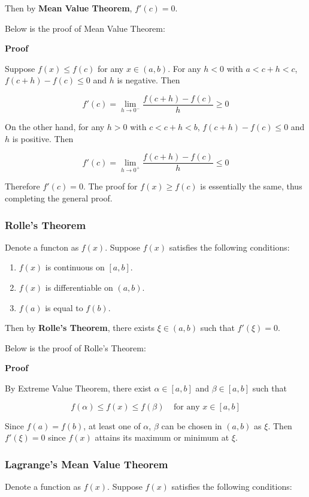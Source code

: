 \documentclass[a4paper,12pt]{article}
\newcommand{\s}{\vspace{1mm}}
\newcommand{\n}{\vspace{3mm}}
\newenvironment{block}[4][Block]{ %
\begin{list}{}{
  \setlength{\leftmargin}{0mm}
  \setlength{\rightmargin}{0mm}
  \setlength{\topsep}{0mm}
  \setlength{\partopsep}{0mm}
  \parsep\parskip
  \setlength{\itemsep}{-\parsep}
  }
  \needspace{\baselineskip}
  \item \textbf{#2 #3} \hspace{1mm} #4
  \vspace{1mm}
  \item
  }
{
\end{list}
}
\newenvironment{alist}{ %
\begin{enumerate}[label=(\alph*)]
}{
\end{enumerate}
}
\begin{document}
Then by \textbf{Mean Value Theorem}, $f'(c)=0$.\n

Below is the proof of Mean Value Theorem:\n

\begin{block}{Proof}{}{}
  Suppose $f(x)\leq f(c)$ for any $x\in (a,b)$. For any $h<0$ with $a<c+h<c$, $f(c+h)-f(c)\leq 0$ and $h$ is negative. Then

  $$f'(c)=\lim_{h\to 0^{-}}\frac{f(c+h)-f(c)}{h}\geq 0$$\s

  On the other hand, for any $h>0$ with $c<c+h<b$, $f(c+h)-f(c)\leq 0$ and $h$ is positive. Then

  $$f'(c)=\lim_{h\to 0^{+}}\frac{f(c+h)-f(c)}{h}\leq 0$$\s

  Therefore $f'(c)=0$. The proof for $f(x)\geq f(c)$ is essentially the same, thus completing the general proof.
\end{block}

\subsubsection{Rolle's Theorem}
Denote a functon as $f(x)$. Suppose $f(x)$ satisfies the following conditions:

\begin{alist}
  \item $f(x)$ is continuous on $[a,b]$.
  \item $f(x)$ is differentiable on $(a,b)$.
  \item $f(a)$ is equal to $f(b)$.
\end{alist}

Then by \textbf{Rolle's Theorem}, there exists $\xi\in (a,b)$ such that $f'(\xi)=0$.\n

Below is the proof of Rolle's Theorem:\n

\begin{block}{Proof}{}{}
  By Extreme Value Theorem, there exist $\alpha\in [a,b]$ and $\beta\in [a,b]$ such that

  $$f(\alpha)\leq f(x)\leq f(\beta)\;\;\;\;\text{for any }x\in [a,b]$$\s

  Since $f(a)=f(b)$, at least one of $\alpha$, $\beta$ can be chosen in $(a,b)$ as $\xi$. Then $f'(\xi)=0$ since $f(x)$ attains its maximum or minimum at $\xi$.
\end{block}

\subsubsection{Lagrange's Mean Value Theorem}
Denote a function as $f(x)$. Suppose $f(x)$ satisfies the following conditions:
\end{document}
